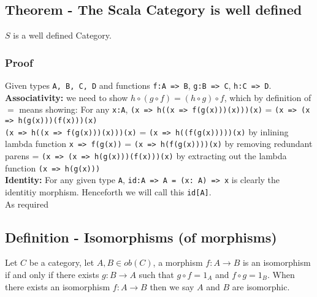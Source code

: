 \documentclass[9pt]{article} %
\begin{document}
\subsection{Theorem - The Scala Category is well defined}

$S$ is a well defined Category.

\subsubsection{Proof}

Given types \texttt{A, B, C, D} and functions \texttt{f:A => B}, \texttt{g:B => C}, \texttt{h:C => D}.\newline
\\
\noindent \textbf{Associativity:} we need to show $h \circ (g \circ f) = (h \circ g) \circ f$, which by definition of $=$ means showing:\newline
\noindent For any \texttt{x:A}, \newline
\texttt{(x => h((x => f(g(x)))(x)))(x)} = \texttt{(x => (x => h(g(x)))(f(x)))(x)}\newline
\\
\noindent \texttt{(x => h((x => f(g(x)))(x)))(x)} = \texttt{(x => h((f(g(x)))))(x)} by inlining lambda function \texttt{x => f(g(x))}\newline
= \texttt{(x => h(f(g(x))))(x)}  by removing redundant parens \newline
= \texttt{(x => (x => h(g(x)))(f(x)))(x)} by extracting out the lambda function \texttt{(x => h(g(x)))}\newline
\\
\noindent \textbf{Identity:} For any given type \texttt{A}, \texttt{id:A => A = (x: A) => x} is clearly the identitiy morphism.  Henceforth we will call this \texttt{id[A]}. \newline
\\
\noindent As required \blacksquare





\subsection{Definition - Isomorphisms (of morphisms)}

Let $C$ be a category, let $A, B \in ob(C)$, a morphism $f: A \rightarrow B$ is an isomorphism if and only if there exists $g: B \rightarrow A$ such that $g \circ f = 1_A$ and $f \circ g = 1_B$. When there exists an isomorphism $f: A \rightarrow B$ then we say $A$ and $B$ are isomorphic.
\end{document}
